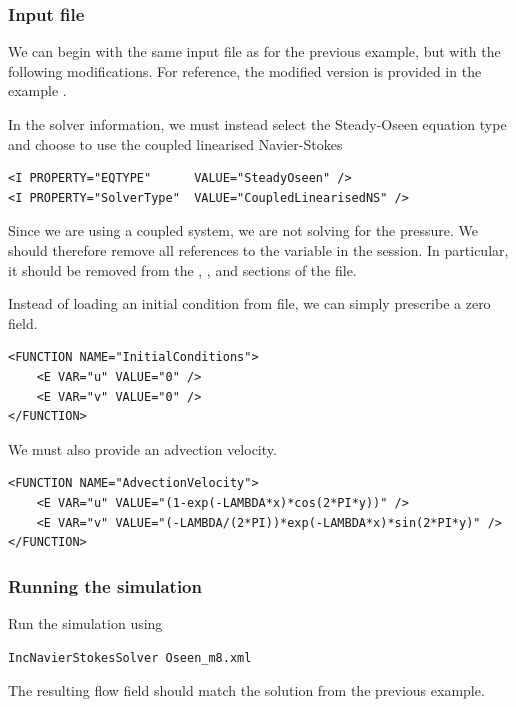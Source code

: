 \subsubsection{Input file}
We can begin with the same input file as for the previous example, but with the
following modifications. For reference, the modified version is provided in the
example .

In the solver information, we must instead select the
Steady-Oseen equation type and choose to use the coupled linearised
Navier-Stokes
\begin{lstlisting}[style=XMLStyle]
<I PROPERTY="EQTYPE"      VALUE="SteadyOseen" />
<I PROPERTY="SolverType"  VALUE="CoupledLinearisedNS" />
\end{lstlisting}

\begin{notebox}
Since we are using a coupled system, we are not solving for the pressure. We
should therefore remove all references to the variable  in the session.
In particular, it should be removed from the ,
,  and  sections of
the file.
\end{notebox}

Instead of loading an initial condition from file, we can simply prescribe a
zero field.
\begin{lstlisting}[style=XMLStyle]
<FUNCTION NAME="InitialConditions">
    <E VAR="u" VALUE="0" />
    <E VAR="v" VALUE="0" />
</FUNCTION>
\end{lstlisting}

We must also provide an advection velocity.
\begin{lstlisting}[style=XMLStyle]
<FUNCTION NAME="AdvectionVelocity">
    <E VAR="u" VALUE="(1-exp(-LAMBDA*x)*cos(2*PI*y))" />
    <E VAR="v" VALUE="(-LAMBDA/(2*PI))*exp(-LAMBDA*x)*sin(2*PI*y)" />
</FUNCTION>
\end{lstlisting}

\subsubsection{Running the simulation}
Run the simulation using
\begin{lstlisting}[style=BashInputStyle]
IncNavierStokesSolver Oseen_m8.xml
\end{lstlisting}

The resulting flow field should match the solution from the previous example.


